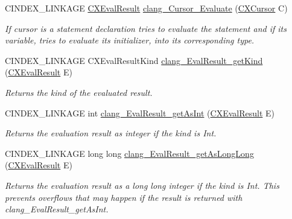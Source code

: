 \begin{DoxyCompactItemize}
C\+I\+N\+D\+E\+X\+\_\+\+L\+I\+N\+K\+A\+GE \mbox{\hyperlink{group__CINDEX__MISC_gaa9270afc68877e1f3b20ce5b343191bc}{C\+X\+Eval\+Result}} \mbox{\hyperlink{group__CINDEX__MISC_ga6be809ca82538f4a610d9a5b18a10ccb}{clang\+\_\+\+Cursor\+\_\+\+Evaluate}} (\mbox{\hyperlink{structCXCursor}{C\+X\+Cursor}} C)
\begin{DoxyCompactList}\small\item\em If cursor is a statement declaration tries to evaluate the statement and if its variable, tries to evaluate its initializer, into its corresponding type. \end{DoxyCompactList}\item 
\mbox{\label{group__CINDEX__MISC_gaea912a0620a9c16c1e46fdedf4825955}} 
C\+I\+N\+D\+E\+X\+\_\+\+L\+I\+N\+K\+A\+GE C\+X\+Eval\+Result\+Kind \mbox{\hyperlink{group__CINDEX__MISC_gaea912a0620a9c16c1e46fdedf4825955}{clang\+\_\+\+Eval\+Result\+\_\+get\+Kind}} (\mbox{\hyperlink{group__CINDEX__MISC_gaa9270afc68877e1f3b20ce5b343191bc}{C\+X\+Eval\+Result}} E)
\begin{DoxyCompactList}\small\item\em Returns the kind of the evaluated result. \end{DoxyCompactList}\item 
\mbox{\label{group__CINDEX__MISC_ga8abe0404897d93813d98bd07a198caa1}} 
C\+I\+N\+D\+E\+X\+\_\+\+L\+I\+N\+K\+A\+GE int \mbox{\hyperlink{group__CINDEX__MISC_ga8abe0404897d93813d98bd07a198caa1}{clang\+\_\+\+Eval\+Result\+\_\+get\+As\+Int}} (\mbox{\hyperlink{group__CINDEX__MISC_gaa9270afc68877e1f3b20ce5b343191bc}{C\+X\+Eval\+Result}} E)
\begin{DoxyCompactList}\small\item\em Returns the evaluation result as integer if the kind is Int. \end{DoxyCompactList}\item 
\mbox{\label{group__CINDEX__MISC_ga488b6b6a445be15e80ffe4816b2086c8}} 
C\+I\+N\+D\+E\+X\+\_\+\+L\+I\+N\+K\+A\+GE long long \mbox{\hyperlink{group__CINDEX__MISC_ga488b6b6a445be15e80ffe4816b2086c8}{clang\+\_\+\+Eval\+Result\+\_\+get\+As\+Long\+Long}} (\mbox{\hyperlink{group__CINDEX__MISC_gaa9270afc68877e1f3b20ce5b343191bc}{C\+X\+Eval\+Result}} E)
\begin{DoxyCompactList}\small\item\em Returns the evaluation result as a long long integer if the kind is Int. This prevents overflows that may happen if the result is returned with clang\+\_\+\+Eval\+Result\+\_\+get\+As\+Int. \end{DoxyCompactList}\item 

\end{DoxyCompactItemize}
